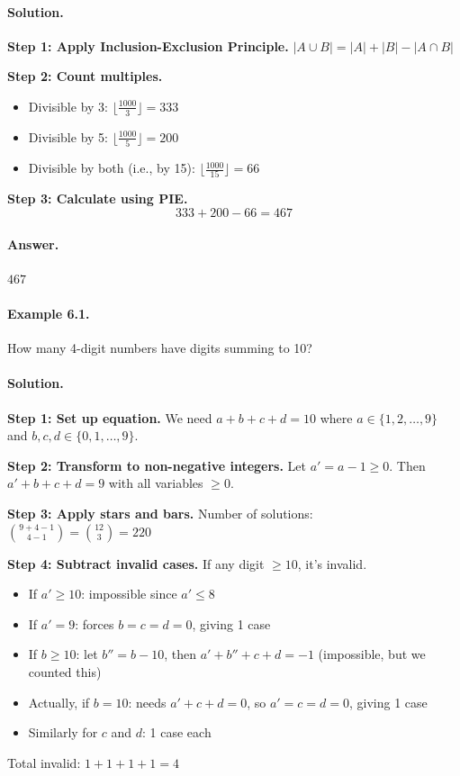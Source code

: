 \documentclass[12pt]{extarticle}
\begin{document}
\paragraph{Solution.}
\textbf{Step 1: Apply Inclusion-Exclusion Principle.} $|A \cup B| = |A| + |B| - |A \cap B|$

\textbf{Step 2: Count multiples.}
\begin{itemize}
    \item Divisible by 3: $\lfloor \frac{1000}{3} \rfloor = 333$
    \item Divisible by 5: $\lfloor \frac{1000}{5} \rfloor = 200$
    \item Divisible by both (i.e., by 15): $\lfloor \frac{1000}{15} \rfloor = 66$
\end{itemize}

\textbf{Step 3: Calculate using PIE.}
\[
333 + 200 - 66 = 467
\]

\paragraph{Answer.} $\boxed{467}$

\paragraph{Example 6.1.} How many 4-digit numbers have digits summing to 10?

\paragraph{Solution.}
\textbf{Step 1: Set up equation.} We need $a+b+c+d=10$ where $a\in\{1,2,\ldots,9\}$ and $b,c,d\in\{0,1,\ldots,9\}$.

\textbf{Step 2: Transform to non-negative integers.} Let $a'=a-1\ge0$. Then $a'+b+c+d=9$ with all variables $\ge 0$.

\textbf{Step 3: Apply stars and bars.} Number of solutions: $\binom{9+4-1}{4-1} = \binom{12}{3} = 220$

\textbf{Step 4: Subtract invalid cases.} If any digit $\ge 10$, it's invalid. 
\begin{itemize}
    \item If $a' \ge 10$: impossible since $a' \le 8$
    \item If $a' = 9$: forces $b=c=d=0$, giving 1 case
    \item If $b \ge 10$: let $b'' = b-10$, then $a'+b''+c+d=-1$ (impossible, but we counted this)
    \item Actually, if $b=10$: needs $a'+c+d=0$, so $a'=c=d=0$, giving 1 case
    \item Similarly for $c$ and $d$: 1 case each
\end{itemize}
Total invalid: $1 + 1 + 1 + 1 = 4$
\end{document}
